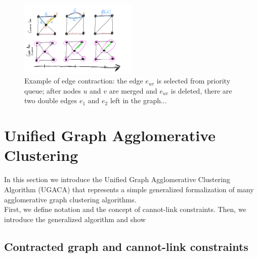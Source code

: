 
\begin{figure}
\centering
\includegraphics[width=0.50\textwidth,trim=0.1in 0.4in 0.2in 0.2in,clip]{./figs/edge_contraction.png} %
\caption{\small 
Example of edge contraction: the edge $e_{uv}$ is selected from priority queue; after nodes $u$ and $v$ are merged and $e_{uv}$ is deleted, there are two double edges $e_1$ and $e_2$ left in the graph...  
\label{fig:edge_contraction_and_contr_graph} }
\end{figure}

\section{Unified Graph Agglomerative Clustering}
In this section we introduce the Unified Graph Agglomerative Clustering Algorithm (UGACA) that represents a simple generalized formalization of many agglomerative graph clustering algorithms. \\
First, we define notation and the concept of cannot-link constraints. Then, we introduce the generalized algorithm and show 

\subsection{Contracted graph and cannot-link constraints} \label{sec:contr_graph_and_CLC}

